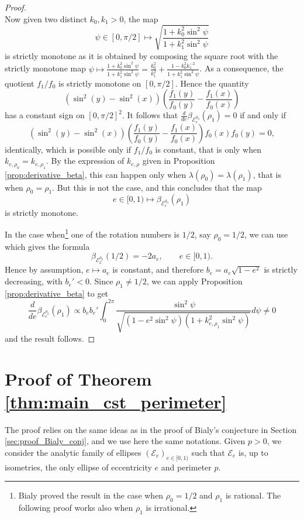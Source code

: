 \documentclass[a4paper]{article}
\theoremstyle{definition}
\begin{document}
\begin{proof}
\[\]
Now given two distinct $k_0, k_1> 0$, the map 
\[
\psi\in[0,\pi/2]\mapsto \sqrt{\frac{1+k_0^2\sin^2\psi}{1+k_1^2\sin^2\psi}}
\]
is strictly monotone as it is obtained by composing the square root with the strictly monotone map $\psi\mapsto \frac{1+k_0^2\sin^2\psi}{1+k_1^2\sin^2\psi} =\frac{k_0^2}{k_1^2}+ \frac{1-k_0^2k_1^{-2}}{1+k_1^2\sin^2\psi}$. As a consequence, the quotient $f_1/f_0$ is strictly monotone on $[0,\pi/2]$. Hence the quantity
\[
(\sin^2(y)-\sin^2(x))\left(\frac{f_1(y)}{f_0(y)}-\frac{f_1(x)}{f_0(x)}\right)
\]
has a constant sign on $[0,\pi/2]^2$. It follows that $\frac{d}{de}\beta_{\mathscr E_e^{\rho_0}}(\rho_1) =0$ if and only if 
\[
(\sin^2(y)-\sin^2(x))\left(\frac{f_1(y)}{f_0(y)}-\frac{f_1(x)}{f_0(x)}\right)f_0(x)f_0(y) = 0,
\]
identically, which is possible only if $f_1/f_0$ is constant, that is only when $k_{e,\rho_0}=k_{e,\rho_1}$. By the expression of $k_{e,\rho}$ given in Proposition \ref{prop:derivative_beta}, this can happen only when $\lambda(\rho_0)=\lambda(\rho_1)$, that is when $\rho_0=\rho_1$. But this is not the case, and this concludes that the map 
    \[
    e\in[0,1)\mapsto\beta_{\mathscr E_e^{\rho_0}}(\rho_1)
    \]
is strictly monotone. 
\vspace{0.2cm}

In the case when\footnote{Bialy \cite{Bialyellipses} proved the result in the case when $\rho_0=1/2$ and $\rho_1$ is rational. The following proof works also when $\rho_1$ is irrational.} one of the rotation numbers is $1/2$, say $\rho_0=1/2$, we can use \cite[Example 2 following Corollary 2.2]{Bialyellipses} which gives the formula
\[
\beta_{\mathscr E_{\mathscr E}^{\rho_0}}(1/2) = -2a_e,
\qquad e\in[0,1).
\]
Hence by assumption, $e\mapsto a_e$ is constant, and therefore $b_e=a_e\sqrt{1-e^2}$ is strictly decreasing, with $b_e'<0$. Since $\rho_1\neq 1/2$, we can apply Proposition \ref{prop:derivative_beta} to get
\[
\frac{d}{de}\beta_{\mathscr E_e^{\rho_0}}(\rho_1)
\propto
b_{e}b_{e}'\int_0^{2\pi}\frac{\sin^2\psi}{\sqrt{(1-e^2\sin^2\psi)(1+k_{e,\rho_1}^2\sin^2\psi)}}d\psi\neq 0
\]
and the result follows.
 \end{proof}

\section{Proof of Theorem \ref{thm:main_cst_perimeter}}

The proof relies on the same ideas as in the proof of Bialy's conjecture in Section \ref{sec:proof_Bialy_conj}, and we use here the same notations. Given $p>0$, we consider the analytic family of ellipses $(\mathscr E_e)_{e\in[0,1)}$ such that $\mathscr E_e$ is, up to isometries, the only ellipse of eccentricity $e$ and perimeter $p$.
\end{document}

